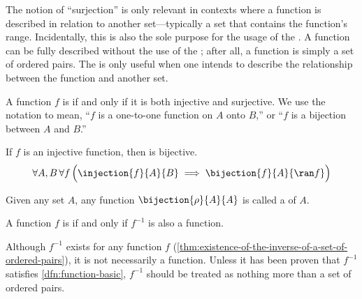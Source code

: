 \begin{rem}
    The notion of ``surjection'' is only relevant in contexts where a function is described in relation
    to another set---typically a set that contains the function's range. Incidentally, this is also the
    sole purpose for the usage of the . A function can be fully described
    without the use of the ; after all, a function is simply a set
    of ordered pairs. The  is only useful when one intends to describe the
    relationship between the function and another set.
\end{rem}

\begin{dfn}[Bijection]
    \label{dfn:bijection}
    A function \( f \) is  if and only if
    it is both injective and surjective.
    We use the notation  to mean, ``\( f \) is a one-to-one
    function on \( A \) onto \( B \),''
    or ``\( f \) is a bijection between \( A \) and \( B \).''
\end{dfn}

\begin{cor}
    \label{thm:every-injective-function-on-its-domain-into-its-range-is-a-bijection}
    If \( f \) is an injective function, then  is bijective.
    \begin{equation*}
        \forall A,B \, \forall f \, \Big( \injection{f}{A}{B} \implies \bijection{f}{A}{\ran f} \Big)
    \end{equation*}
\end{cor}

\begin{dfn}[Permutation]
     \label{dfn:permutation-of-a-set}
    Given any set \( A \), any function \( \bijection{\rho}{A}{A} \) is called a  of \( A \).
\end{dfn}

\begin{dfn}[Invertibility]
    \label{dfn:invertibility-of-functions}
    A function \( f \) is  if and only if \( f^{-1} \) is also a function.
\end{dfn}

\begin{rem}
    Although \( f^{-1} \) exists for any function \( f \)
    (\cref{thm:existence-of-the-inverse-of-a-set-of-ordered-pairs}),
    it is not necessarily a function. Unless it has been proven that
    \( f^{-1} \) satisfies \cref{dfn:function-basic}, \( f^{-1} \) should
    be treated as nothing more than a set of ordered pairs.
\end{rem}

